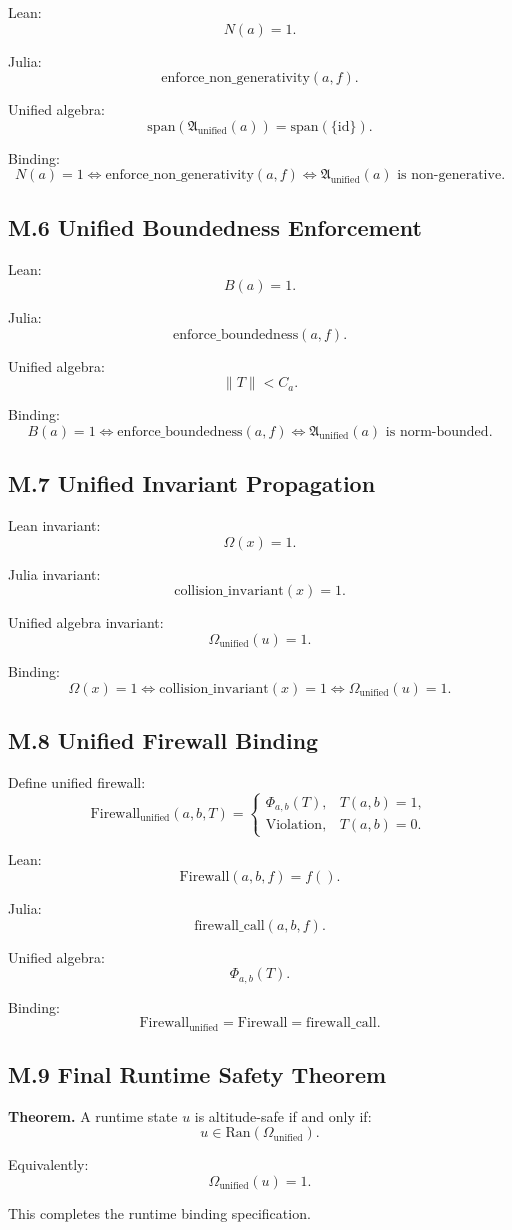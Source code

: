 Lean:
\[
N(a)=1.
\]

Julia:
\[
\mathrm{enforce\_non\_generativity}(a,f).
\]

Unified algebra:
\[
\mathrm{span}(\mathfrak{A}_{\mathrm{unified}}(a))
=
\mathrm{span}(\{\mathrm{id}\}).
\]

Binding:
\[
N(a)=1
\iff
\mathrm{enforce\_non\_generativity}(a,f)
\iff
\mathfrak{A}_{\mathrm{unified}}(a)
\text{ is non-generative}.
\]

\subsection*{M.6 Unified Boundedness Enforcement}

Lean:
\[
B(a)=1.
\]

Julia:
\[
\mathrm{enforce\_boundedness}(a,f).
\]

Unified algebra:
\[
\|T\| < C_a.
\]

Binding:
\[
B(a)=1
\iff
\mathrm{enforce\_boundedness}(a,f)
\iff
\mathfrak{A}_{\mathrm{unified}}(a)
\text{ is norm-bounded}.
\]

\subsection*{M.7 Unified Invariant Propagation}

Lean invariant:
\[
\Omega(x)=1.
\]

Julia invariant:
\[
\mathrm{collision\_invariant}(x)=1.
\]

Unified algebra invariant:
\[
\Omega_{\mathrm{unified}}(u)=1.
\]

Binding:
\[
\Omega(x)=1
\iff
\mathrm{collision\_invariant}(x)=1
\iff
\Omega_{\mathrm{unified}}(u)=1.
\]

\subsection*{M.8 Unified Firewall Binding}

Define unified firewall:
\[
\mathrm{Firewall}_{\mathrm{unified}}(a,b,T)
=
\begin{cases}
\Phi_{a,b}(T), & T(a,b)=1, \\
\mathrm{Violation}, & T(a,b)=0.
\end{cases}
\]

Lean:
\[
\mathrm{Firewall}(a,b,f)=f().
\]

Julia:
\[
\mathrm{firewall\_call}(a,b,f).
\]

Unified algebra:
\[
\Phi_{a,b}(T).
\]

Binding:
\[
\mathrm{Firewall}_{\mathrm{unified}}
=
\mathrm{Firewall}
=
\mathrm{firewall\_call}.
\]

\subsection*{M.9 Final Runtime Safety Theorem}

\textbf{Theorem.}  
A runtime state $u$ is altitude-safe if and only if:
\[
u \in \mathrm{Ran}(\Omega_{\mathrm{unified}}).
\]

Equivalently:
\[
\Omega_{\mathrm{unified}}(u)=1.
\]

This completes the runtime binding specification.
